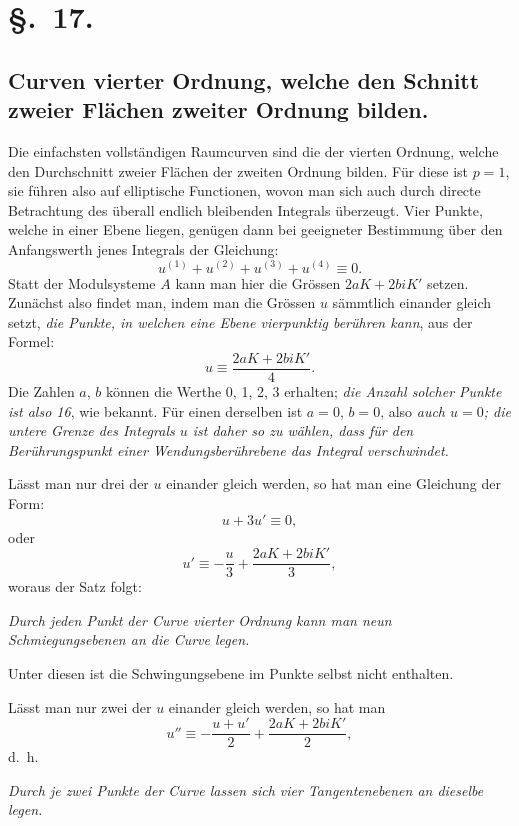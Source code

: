 \documentclass{article}
\begin{document}
\section*{§.~17.}
\subsection*{Curven vierter Ordnung, welche den Schnitt zweier Flächen zweiter Ordnung bilden.}

Die einfachsten vollständigen Raumcurven sind die der vierten Ordnung, welche den Durchschnitt zweier Flächen der zweiten Ordnung bilden. Für diese ist $p=1$, sie führen also auf elliptische Functionen, wovon man sich auch durch directe Betrachtung des überall endlich bleibenden Integrals überzeugt. Vier Punkte, welche in einer Ebene liegen, genügen dann bei geeigneter Bestimmung über den Anfangswerth jenes Integrals der Gleichung:
\[
u^{(1)}+u^{(2)}+u^{(3)}+u^{(4)} \equiv 0.
\]
Statt der Modulsysteme $A$ kann man hier die Grössen $2aK+2biK'$ setzen. Zunächst also findet man, indem man die Grössen $u$ sämmtlich einander gleich setzt, \emph{die Punkte, in welchen eine Ebene vierpunktig berühren kann}, aus der Formel:
\[
u \equiv \frac{2aK+2biK'}{4}. \tag{25.}
\]
Die Zahlen $a$, $b$ können die Werthe 0, 1, 2, 3 erhalten; \emph{die Anzahl solcher Punkte ist also 16}, wie bekannt. Für einen derselben ist $a=0$, $b=0$, also \emph{auch $u=0$; die untere Grenze des Integrals $u$ ist daher so zu wählen, dass für den Berührungspunkt einer Wendungsberührebene das Integral verschwindet.}


Lässt man nur drei der $u$ einander gleich werden, so hat man eine Gleichung der Form:
\[
u+3u' \equiv 0,
\]
oder
\[
u' \equiv -\frac{u}{3}+\frac{2aK+2biK'}{3}, \tag{26.}
\]
woraus der Satz folgt:

\emph{Durch jeden Punkt der Curve vierter Ordnung kann man neun Schmiegungsebenen an die Curve legen.}

Unter diesen ist die Schwingungsebene im Punkte selbst nicht enthalten.

Lässt man nur zwei der $u$ einander gleich werden, so hat man
\[
u'' \equiv -\frac{u+u'}{2}+\frac{2aK+2biK'}{2}, \tag{27.}
\]
d.\ h.

\emph{Durch je zwei Punkte der Curve lassen sich vier Tangentenebenen an dieselbe legen.}
\end{document}
